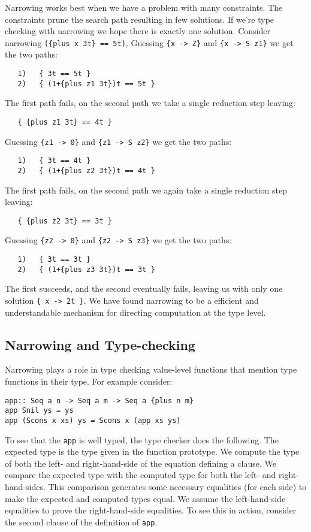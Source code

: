 \documentclass[11pt,twoside]{article}
\begin{document}
Narrowing works best when we have a problem with many constraints. The
constraints prune the search path resulting in few solutions.
If we're type checking with narrowing we hope there is exactly one solution. 
Consider narrowing \verb+({plus x 3t} == 5t)+,
Guessing \verb+{x -> Z}+ and \verb+{x -> S z1}+ we get the two
paths:
{ %
\begin{verbatim}
   1)   { 3t == 5t }
   2)   { (1+{plus z1 3t})t == 5t }
\end{verbatim}}
The first path fails, on the second path we take a single reduction step
leaving:
{ %
\begin{verbatim}
   { {plus z1 3t} == 4t }
\end{verbatim}}
Guessing \verb+{z1 -> 0}+ and \verb+{z1 -> S z2}+ we get the two
paths:
{ %
\begin{verbatim}
   1)   { 3t == 4t }
   2)   { (1+{plus z2 3t})t == 4t }
\end{verbatim}}
The first path fails, on the second path we again
take a single reduction step leaving:
{ %
\begin{verbatim}
   { {plus z2 3t} == 3t }
\end{verbatim}}
Guessing \verb+{z2 -> 0}+ and \verb+{z2 -> S z3}+ we get the two
paths:
{ %
\begin{verbatim}
   1)   { 3t == 3t }
   2)   { (1+{plus z3 3t})t == 3t }
\end{verbatim}}   
The first succeeds, and the second eventually fails, leaving us
with only one solution \verb+{ x -> 2t }+. We have found
narrowing to be a efficient and understandable mechanism
for directing computation at the type level.


\subsection{Narrowing and Type-checking}

Narrowing plays a role in type checking value-level functions that mention
type functions in their type. For example consider:

{\small
\begin{verbatim}
app:: Seq a n -> Seq a m -> Seq a {plus n m}
app Snil ys = ys
app (Scons x xs) ys = Scons x (app xs ys)
\end{verbatim}}

To see that the {\tt app} is well typed, the type checker does the following.
The expected type is the type given in the function prototype. We
compute the type of both the left- and right-hand-side of the equation
defining a clause. We compare the expected type with the computed type
for both the left- and right-hand-sides. This comparison generates
some necessary equalities (for each side) to make the expected and computed
types equal. We assume the left-hand-side
equalities to prove the right-hand-side equalities. To see this in
action, consider the second clause of the definition of \verb+app+.
\end{document}
